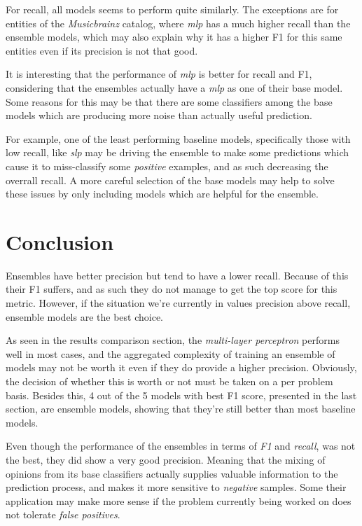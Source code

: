 \documentclass[epsfig,a4paper,11pt,titlepage,twoside,openany]{book}
\begin{document}
For recall, all models seems to perform quite similarly. The exceptions are for entities of the \textit{Musicbrainz} catalog, where \textit{mlp} has a much higher recall than the ensemble models, which may also explain why it has a higher F1 for this same entities even if its precision is not that good.

It is interesting that the performance of \textit{mlp} is better for recall and F1, considering that the ensembles actually have a \textit{mlp} as one of their base model. Some reasons for this may be that there are some classifiers among the base models which are producing more noise than actually useful prediction. 

For example, one of the least performing baseline models, specifically those with low recall, like \textit{slp} may be driving the ensemble to make some predictions which cause it to miss-classify some \textit{positive} examples, and as such decreasing the overrall recall. A more careful selection of the base models may help to solve these issues by only including models which are helpful for the ensemble.


\chapter{Conclusion}
\label{chap:conclusion}


Ensembles have better precision but tend to have a lower recall. Because of this their F1 suffers, and as such they do not manage to get the top score for this metric. However, if the situation we're currently in values precision above recall, ensemble models are the best choice.

As seen in the results comparison section, the \textit{multi-layer perceptron} performs well in most cases, and the aggregated complexity of training an ensemble of models may not be worth it even if they do provide a higher precision. Obviously, the decision of whether this is worth or not must be taken on a per problem basis. Besides this, 4 out of the 5 models with best F1 score, presented in the last section, are ensemble models, showing that they're still better than most baseline models.

Even though the performance of the ensembles in terms of \textit{F1} and \textit{recall}, was not the best, they did show a very good precision. Meaning that the mixing of opinions from its base classifiers actually supplies valuable information to the prediction process, and makes it more sensitive to \textit{negative} samples. Some their application may make more sense if the problem currently being worked on does not tolerate \textit{false positives}.
\end{document}
